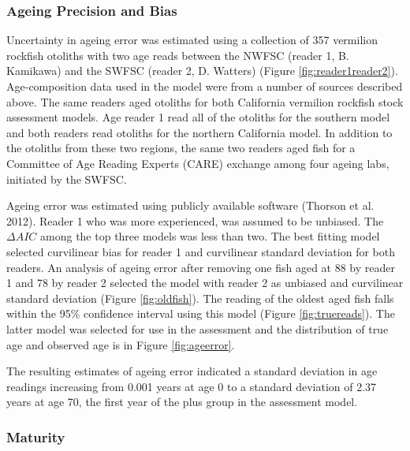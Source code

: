 \documentclass[11pt,
  english,
]{article}
\begin{document}
\hypertarget{ageing-precision-and-bias}{%
\subsubsection{Ageing Precision and Bias}\label{ageing-precision-and-bias}}

\leavevmode\tagmcend\tagstructend

Uncertainty in ageing error was estimated using a collection of 357 vermilion rockfish otoliths with two age reads between the NWFSC (reader 1, B. Kamikawa) and the SWFSC (reader 2, D. Watters) (Figure \ref{fig:reader1reader2}). Age-composition data used in the model were from a number of sources described above. The same readers aged otoliths for both California vermilion rockfish stock assessment models. Age reader 1 read all of the otoliths for the southern model and both readers read otoliths for the northern California model. In addition to the otoliths from these two regions, the same two readers aged fish for a Committee of Age Reading Experts (CARE) exchange among four ageing labs, initiated by the SWFSC.

Ageing error was estimated using publicly available software {(Thorson et al. 2012)\leavevmode\tagmcend\tagstructend}. Reader 1 who was more experienced, was assumed to be unbiased. The {\(\Delta AIC\)\leavevmode\tagmcend\tagstructend} among the top three models was less than two. The best fitting model selected curvilinear bias for reader 1 and curvilinear standard deviation for both readers. An analysis of ageing error after removing one fish aged at 88 by reader 1 and 78 by reader 2 selected the model with reader 2 as unbiased and curvilinear standard deviation (Figure \ref{fig:oldfish}). The reading of the oldest aged fish falls within the 95\% confidence interval using this model (Figure \ref{fig:truereads}). The latter model was selected for use in the assessment and the distribution of true age and observed age is in Figure \ref{fig:ageerror}.

The resulting estimates of ageing error indicated a standard deviation in age readings increasing from 0.001 years at age 0 to a standard deviation of 2.37 years at age 70, the first year of the plus group in the assessment model.


\hypertarget{maturity}{%
\subsubsection{Maturity}\label{maturity}}
\end{document}
